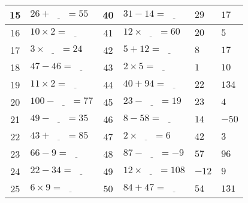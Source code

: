 \documentclass[french,a4paper,10pt]{article}
\begin{document}
\begin{tabular}{|c|p{4cm}|c|p{4cm}||p{1cm}|p{1cm}|}
\hline
15 & $26 + \underline{\phantom{999}} = 55$ & 40 & $31 - 14 = \underline{\phantom{999}}$ & $29$ & $17$ \\
\hline
16 & $10 \times 2 = \underline{\phantom{999}}$ & 41 & $12 \times \underline{\phantom{999}} = 60$ & $20$ & $5$ \\
\hline
17 & $3 \times \underline{\phantom{999}} = 24$ & 42 & $5 + 12 = \underline{\phantom{999}}$ & $8$ & $17$ \\
\hline
18 & $47 - 46 = \underline{\phantom{999}}$ & 43 & $2 \times 5 = \underline{\phantom{999}}$ & $1$ & $10$ \\
\hline
19 & $11 \times 2 = \underline{\phantom{999}}$ & 44 & $40 + 94 = \underline{\phantom{999}}$ & $22$ & $134$ \\
\hline
20 & $100 - \underline{\phantom{999}} = 77$ & 45 & $23 - \underline{\phantom{999}} = 19$ & $23$ & $4$ \\
\hline
21 & $49 - \underline{\phantom{999}} = 35$ & 46 & $8 - 58 = \underline{\phantom{999}}$ & $14$ & $-50$ \\
\hline
22 & $43 + \underline{\phantom{999}} = 85$ & 47 & $2 \times \underline{\phantom{999}} = 6$ & $42$ & $3$ \\
\hline
23 & $66 - 9 = \underline{\phantom{999}}$ & 48 & $87 - \underline{\phantom{999}} = -9$ & $57$ & $96$ \\
\hline
24 & $22 - 34 = \underline{\phantom{999}}$ & 49 & $12 \times \underline{\phantom{999}} = 108$ & $-12$ & $9$ \\
\hline
25 & $6 \times 9 = \underline{\phantom{999}}$ & 50 & $84 + 47 = \underline{\phantom{999}}$ & $54$ & $131$ \\
\hline

\end{tabular}
\begin{center}
\end{center}                 
\end{document}
